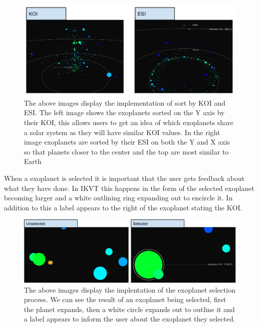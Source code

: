 \begin{figure}[H]
  \centering
      \includegraphics[width=1\textwidth]{images/ESIKOI.pdf}
  \caption[Implementation of sort by KOI and ESI]{The above images display the
implementation of sort by KOI and ESI. The left image shows the exoplanets sorted on the Y axis
by their KOI, this allows users to get an idea of which exoplanets share a solar
system as they will have similar KOI values. In the right image exoplanets are
sorted by their ESI on both the Y and X axis so that planets closer to the
center and the top are most similar to Earth}  
    \label{fig:ESIKOI}
\end{figure}

When a exoplanet is selected it is important that the user gets feedback about
what they have done. In IKVT this happens in the form of the selected exoplanet
becoming larger and a white outlining ring expanding out to encircle it. In
addition to this a label appears to the right of the exoplanet stating the
KOI. 

\begin{figure}[H]
  \centering
      \includegraphics[width=1\textwidth]{images/selectedPlanet.jpg}
  \caption[Implentation of the exoplanet selection process]{The above images
display the implentation of the exoplanet selection process. We can see the
result of an exoplanet being selected, first the planet expands, then a white
circle expands out to outline it and a label appears to inform the user about
the exoplanet they selected.}  
    \label{fig:selectedPlanet}
\end{figure}

